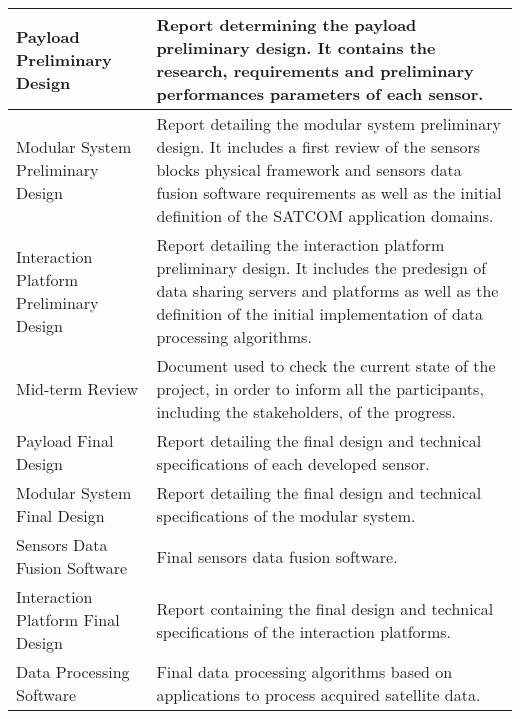 \begin{longtable}[H]{>{\raggedright\arraybackslash}p{4cm} p{10cm}}
	Payload Preliminary Design  & 
	Report determining the payload preliminary design. It contains the research, requirements and preliminary performances parameters of each sensor.
	 \vspace{0.2cm}
	\\ \midrule

	Modular System Preliminary Design  & 
	Report detailing the modular system preliminary design. It includes a first review of the sensors blocks physical framework and sensors data fusion software requirements as well as the initial definition of the SATCOM application domains. 
	\vspace{0.2cm}
	\\ \midrule

	Interaction Platform Preliminary Design  & 
	Report detailing the interaction platform preliminary design. It includes the predesign of data sharing servers and platforms as well as the definition of the initial implementation of data processing algorithms.  
	\vspace{0.2cm}
	\\ \midrule
	
	Mid-term Review & 
	Document used to check the current state of the project, in order to inform all the participants, including the stakeholders, of the progress. 
	\vspace{0.2cm}
	\\ \midrule
	
	Payload Final Design  & 
	Report detailing the final design and technical specifications of each developed sensor. 
	\vspace{0.2cm}
	\\ \midrule

	Modular System  Final Design  & 
	Report detailing the final design and technical specifications of the modular system. 
	\vspace{0.2cm}
	\\ \midrule

	Sensors Data Fusion Software  & 
	Final sensors data fusion software.
	\vspace{0.2cm}
	\\ \midrule

	Interaction Platform Final Design  & 
	Report containing the final design and technical specifications of the interaction platforms. 
	\vspace{0.2cm}
	\\ \midrule

	Data Processing Software  & 
	Final data processing algorithms based on applications to process acquired satellite data. 
	\vspace{0.2cm}
	\\ \midrule


\end{longtable}

